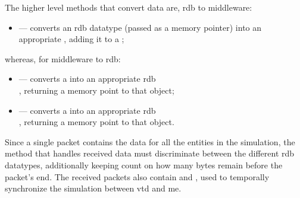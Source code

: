 The higher level methods that convert data are, \gls{rdb} to \gls{middleware}:

\begin{itemize}
	\item {} --- converts an \gls{rdb} datatype (passed as a memory pointer) into an appropriate , adding it to a ;
\end{itemize}

\FLOATnoindent whereas, for \gls{middleware} to \gls{rdb}:

\begin{itemize}
	\item {} --- converts a  into an appropriate \gls{rdb} \\ , returning a memory point to that object;
	\item {} --- converts a  into an appropriate \gls{rdb} \\ , returning a memory point to that object.
\end{itemize}

Since a single  \gls{packet} contains the data for all the entities in the simulation, the method that handles received data must discriminate between the different \gls{rdb} datatypes, additionally keeping count on how many bytes remain before the \gls{packet}'s end. The received \glspl{packet} also contain  and , used to temporally synchronize the simulation between \gls{vtd} and \gls{me}.

